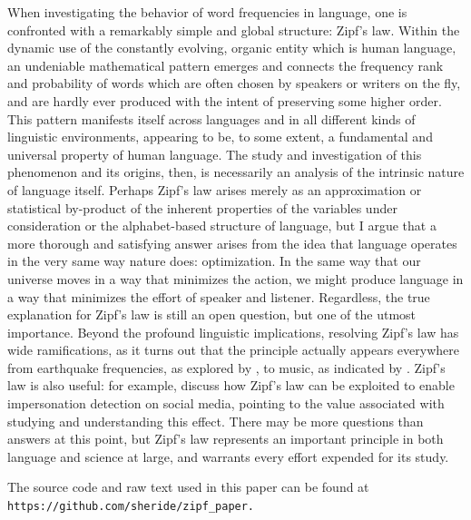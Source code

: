 \documentclass[10pt]{article}
\begin{document}
\begin{flushleft}
    \hspace*{0.5in} When investigating the behavior of word frequencies in language, one is confronted with a remarkably simple and global structure: Zipf's law. Within the dynamic use of the constantly evolving, organic entity which is human language, an undeniable mathematical pattern emerges and connects the frequency rank and probability of words which are often chosen by speakers or writers on the fly, and are hardly ever produced with the intent of preserving some higher order. This pattern manifests itself across languages and in all different kinds of linguistic environments, appearing to be, to some extent, a fundamental and universal property of human language. The study and investigation of this phenomenon and its origins, then, is necessarily an analysis of the intrinsic nature of language itself. Perhaps Zipf's law arises merely as an approximation or statistical by-product of the inherent properties of the variables under consideration or the alphabet-based structure of language, but I argue that a more thorough and satisfying answer arises from the idea that language operates in the very same way nature does: optimization. In the same way that our universe moves in a way that minimizes the action, we might produce language in a way that minimizes the effort of speaker and listener. Regardless, the true explanation for Zipf's law is still an open question, but one of the utmost importance. Beyond the profound linguistic implications, resolving Zipf's law has wide ramifications, as it turns out that the principle actually appears everywhere from earthquake frequencies, as explored by \textcite{earthquake}, to music, as indicated by \textcite{music}. Zipf's law is also useful: for example, \textcite{impersonation} discuss how Zipf's law can be exploited to enable impersonation detection on social media, pointing to the value associated with studying and understanding this effect. There may be more questions than answers at this point, but Zipf's law represents an important principle in both language and science at large, and warrants every effort expended for its study.
     
    \bigskip
    
    The source code and raw text used in this paper can be found at \texttt{https://github.com/sheride/zipf\_paper.}
\end{flushleft}

\newpage

%
%
\printbibliography
\end{document}
